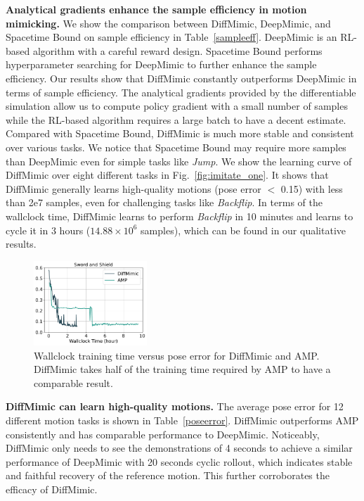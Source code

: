 \textbf{Analytical gradients enhance the sample efficiency in motion mimicking.} We show the comparison between DiffMimic, DeepMimic, and Spacetime Bound on sample efficiency in Table~\ref{sampleeff}. DeepMimic is an RL-based algorithm with a careful reward design. Spacetime Bound performs hyperparameter searching for DeepMimic to further enhance the sample efficiency. Our results show that DiffMimic constantly outperforms DeepMimic in terms of sample efficiency. The analytical gradients provided by the differentiable simulation allow us to compute policy gradient with a small number of samples while the RL-based algorithm requires a large batch to have a decent estimate. Compared with Spacetime Bound, DiffMimic is much more stable and consistent over various tasks. We notice that Spacetime Bound may require more samples than DeepMimic even for simple tasks like \textit{Jump}. We show the learning curve of DiffMimic over eight different tasks in Fig.~\ref{fig:imitate_one}. It shows that DiffMimic generally learns high-quality motions (pose error $<$ 0.15) with less than 2e7 samples, even for challenging tasks like \textit{Backflip}. In terms of the wallclock time, DiffMimic learns to perform \textit{Backflip} in 10 minutes and learns to cycle it in 3 hours ($14.88 \times 10^6$ samples), which can be found in our qualitative results.
\begin{figure}
     \centering
     \vspace{-10pt}
         \centering
         \includegraphics[width=0.38\textwidth]{figures/wallclock_sword.pdf}
     \caption{Wallclock training time versus pose error for DiffMimic and AMP. DiffMimic takes half of the training time required by AMP to have a comparable result.}
    \label{fig:Wallclock time}
\end{figure}

\textbf{DiffMimic can learn high-quality motions.} The average pose error for 12 different motion tasks is shown in Table~\ref{poseerror}. DiffMimic outperforms AMP consistently and has comparable performance to DeepMimic. 
Noticeably, DiffMimic only needs to see the demonstrations of 4 seconds to achieve a similar performance of DeepMimic with 20 seconds cyclic rollout, which indicates stable and faithful recovery of the reference motion. This further corroborates the efficacy of DiffMimic. 

